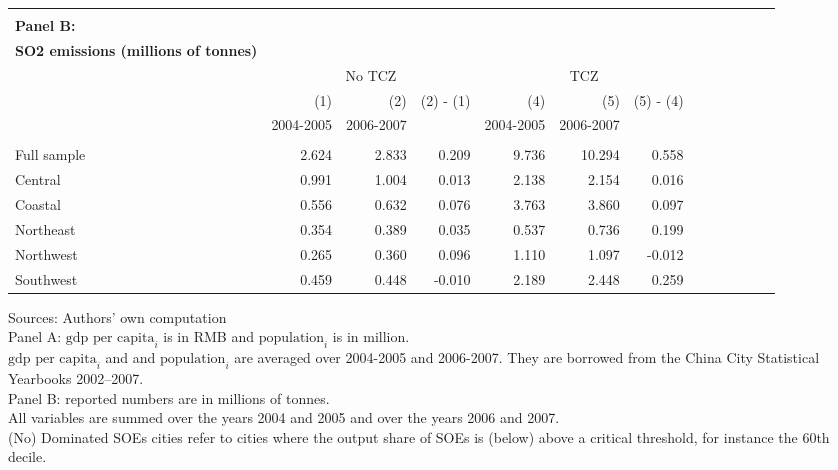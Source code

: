 \documentclass[12pt]{article}
\begin{document}
\begin{table}[!htb]
\begin{adjustbox}{width=\textwidth, totalheight=\baselineskip,keepaspectratio}
\begin{tabular}{lrrrrrrrrrrrr}
      \bottomrule
      \\ %
        \multicolumn{1}{l}{\textbf{Panel B:}} \\
        \multicolumn{1}{l}{\textbf{SO2 emissions (millions of tonnes)}} \\
        \toprule
       & \multicolumn{3}{c}{No TCZ} & \multicolumn{3}{c}{TCZ} \\
      & (1)  & (2) & (2) - (1) & (4)  & (5)  &(5) - (4) \\
      & 2004-2005 &  2006-2007 & &  2004-2005 &2006-2007  \\
\hline \\[-1.8ex] 
Full sample &  2.624  & 2.833  &  0.209 &  9.736 &10.294  &  0.558  \\
Central     &  0.991  & 1.004  &  0.013 & 2.138 & 2.154  &   0.016  \\
Coastal     &  0.556  & 0.632  &  0.076 & 3.763 & 3.860 &   0.097  \\
Northeast   &  0.354  & 0.389  &  0.035 & 0.537 & 0.736 &    0.199  \\
Northwest   &  0.265  &  0.360 &  0.096 & 1.110 & 1.097 &    -0.012  \\
Southwest   &  0.459  & 0.448  &  -0.010 & 2.189 &  2.448 &   0.259  \\
      \bottomrule
      \hline
    \end{tabular}
    \end{adjustbox}
    \begin{tablenotes}
      \small
      \item 
      \footnotesize{
      Sources: Authors' own computation \\
  Panel A: $\text{gdp per capita}_i$ is in RMB and $\text{population}_i$ is in million. \\ $\text{gdp per capita}_i$ and and $\text{population}_i$ are averaged over 2004-2005 and 2006-2007. They are borrowed from the China City Statistical Yearbooks 2002–2007. \\
  Panel B: reported numbers are in millions of tonnes.  \\
  All variables are summed over the years 2004 and 2005 and over the years 2006 and 2007. \\
      (No) Dominated SOEs cities refer to cities where the output share of SOEs is (below) above a critical threshold, for instance the 60th decile.  \\
      }
    \end{tablenotes}
\end{table}
\end{document}
